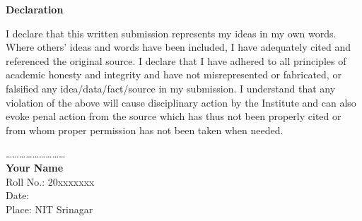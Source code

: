 \documentclass[12pt, a4paper, twoside, openright]{Thesis} %
\newcommand\myemptypage{
    \null
    \thispagestyle{empty}
    \addtocounter{page}{-1}
    \newpage
    }
\begin{document}
{

\vspace{-1in}









\clearpage %

\myemptypage



{ %

\centerline{\textbf{\LARGE {Declaration}}}}
\vspace{3em}
I declare that this written submission represents my ideas in my own words. Where others' ideas and words have been included, I have adequately cited and referenced the original source. I declare that I have adhered to all principles of academic honesty and integrity and have not misrepresented or fabricated, or falsified any idea/data/fact/source in my submission. I understand that any violation of the above will cause disciplinary action by the Institute and can also evoke penal action from the source which has thus not been properly cited or from whom proper permission has not been taken when needed.

\bigskip
\bigskip
\bigskip
\bigskip

\begin{flushleft}
\ldots \ldots \ldots \ldots \ldots \ldots \ldots \ldots \ldots\\
\vspace{2mm}
\textbf{Your Name} \\
Roll No.: 20xxxxxxx \\
Date:  \\
Place: NIT Srinagar
\end{flushleft}

}
\end{document}
